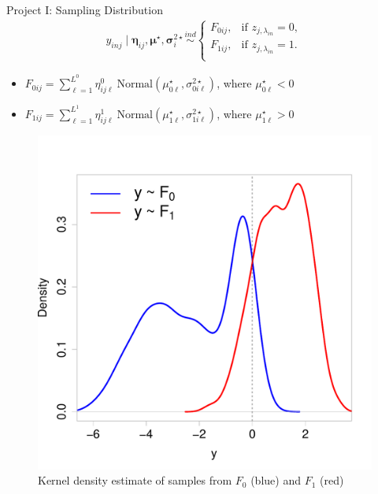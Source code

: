 \documentclass[ignorenonframetext,]{beamer}
\newcommand{\ind}{\overset{ind}{\sim}}
\def\bmu{\bm{\mu}}
\def\bsig{\bm{\sigma}}
\def\bet{\bm{\eta}}
\begin{document}
\begin{frame}{Project I: Sampling Distribution}
\begin{align*}
y_{inj} \mid \bet_{ij}, \bmu^\star, \bsig^{2 \star}_{i} \ind
\begin{cases}
  F_{0ij}, &\mbox{if $z_{j,\lambda_{in}}=0$},\\
  F_{1ij}, &\mbox{if $z_{j,\lambda_{in}}=1$}.\\
\end{cases} \label{eq:y-mix}
\end{align*}
\pause
%
\begin{itemize}
  \item $F_{0ij} = \sum_{\ell=1}^{L^0} \eta^0_{ij\ell}~\text{Normal}(\mu^\star_{0\ell}, \sigma^{2 \star}_{0i\ell})$, where $\mu^\star_{0\ell} < 0$
  \item $F_{1ij} = \sum_{\ell=1}^{L^1} \eta^1_{ij\ell}~\text{Normal}(\mu^\star_{1\ell}, \sigma^{2 \star}_{1i\ell})$, where $\mu^\star_{1\ell} > 0$
\end{itemize}
%
\begin{figure}
  \begin{center}
    \includegraphics[scale=.2]{img/mixture.pdf}
    \caption{Kernel density estimate of samples from $F_0$ (blue) and $F_1$ (red)}
  \end{center}
\end{figure}
\end{frame}
\end{document}
